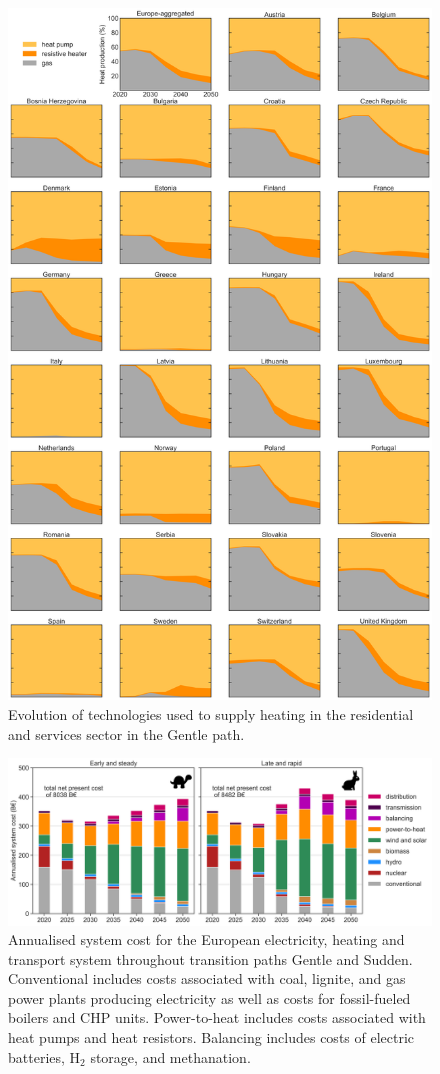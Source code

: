 \documentclass[3p]{elsarticle} %
\begin{document}
\begin{figure}[!h]
\centering
\includegraphics[width=0.8\columnwidth]{../figures/heat_production_Base_go.png}
\caption{Evolution of technologies used to supply heating in the residential and services sector in the Gentle path. } \label{fig_heating_shares} 
\end{figure}

\begin{figure}[!h]
	\centering
	\includegraphics[width=\columnwidth]{../figures/System_cost_w_EV_exp.png}
	\caption{Annualised system cost for the European electricity, heating and transport system throughout transition paths Gentle and Sudden. Conventional includes costs associated with coal, lignite, and gas power plants producing electricity as well as costs for fossil-fueled boilers and CHP units. Power-to-heat includes costs associated with heat pumps and heat resistors. Balancing includes costs of electric batteries, H$_2$ storage, and methanation.} 
\end{figure}
\clearpage
\end{document}
